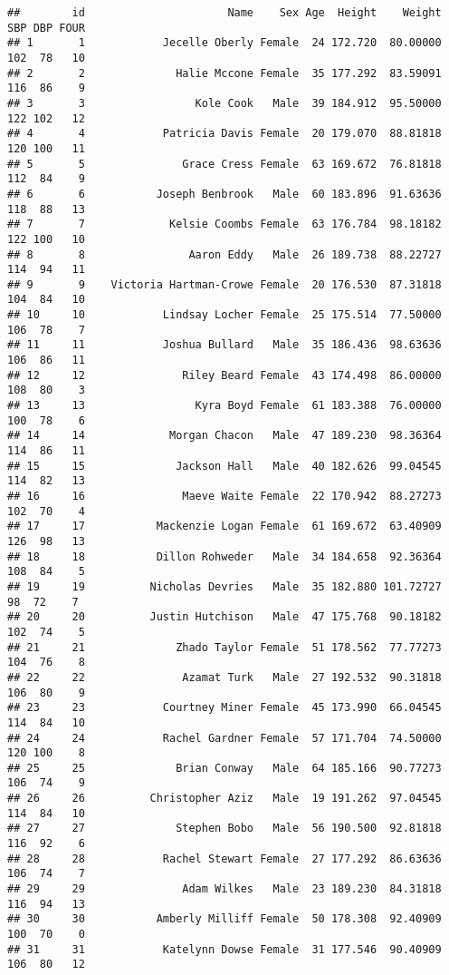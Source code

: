 \documentclass[
]{article}
\begin{document}
\begin{verbatim}
##        id                      Name    Sex Age  Height    Weight SBP DBP FOUR
## 1       1            Jecelle Oberly Female  24 172.720  80.00000 102  78   10
## 2       2              Halie Mccone Female  35 177.292  83.59091 116  86    9
## 3       3                 Kole Cook   Male  39 184.912  95.50000 122 102   12
## 4       4            Patricia Davis Female  20 179.070  88.81818 120 100   11
## 5       5               Grace Cress Female  63 169.672  76.81818 112  84    9
## 6       6           Joseph Benbrook   Male  60 183.896  91.63636 118  88   13
## 7       7             Kelsie Coombs Female  63 176.784  98.18182 122 100   10
## 8       8                Aaron Eddy   Male  26 189.738  88.22727 114  94   11
## 9       9    Victoria Hartman-Crowe Female  20 176.530  87.31818 104  84   10
## 10     10            Lindsay Locher Female  25 175.514  77.50000 106  78    7
## 11     11            Joshua Bullard   Male  35 186.436  98.63636 106  86   11
## 12     12               Riley Beard Female  43 174.498  86.00000 108  80    3
## 13     13                 Kyra Boyd Female  61 183.388  76.00000 100  78    6
## 14     14             Morgan Chacon   Male  47 189.230  98.36364 114  86   11
## 15     15              Jackson Hall   Male  40 182.626  99.04545 114  82   13
## 16     16               Maeve Waite Female  22 170.942  88.27273 102  70    4
## 17     17           Mackenzie Logan Female  61 169.672  63.40909 126  98   13
## 18     18           Dillon Rohweder   Male  34 184.658  92.36364 108  84    5
## 19     19          Nicholas Devries   Male  35 182.880 101.72727  98  72    7
## 20     20          Justin Hutchison   Male  47 175.768  90.18182 102  74    5
## 21     21              Zhado Taylor Female  51 178.562  77.77273 104  76    8
## 22     22               Azamat Turk   Male  27 192.532  90.31818 106  80    9
## 23     23            Courtney Miner Female  45 173.990  66.04545 114  84   10
## 24     24            Rachel Gardner Female  57 171.704  74.50000 120 100    8
## 25     25              Brian Conway   Male  64 185.166  90.77273 106  74    9
## 26     26          Christopher Aziz   Male  19 191.262  97.04545 114  84   10
## 27     27              Stephen Bobo   Male  56 190.500  92.81818 116  92    6
## 28     28            Rachel Stewart Female  27 177.292  86.63636 106  74    7
## 29     29               Adam Wilkes   Male  23 189.230  84.31818 116  94   13
## 30     30           Amberly Milliff Female  50 178.308  92.40909 100  70    0
## 31     31            Katelynn Dowse Female  31 177.546  90.40909 106  80   12

\end{verbatim}
\end{document}
